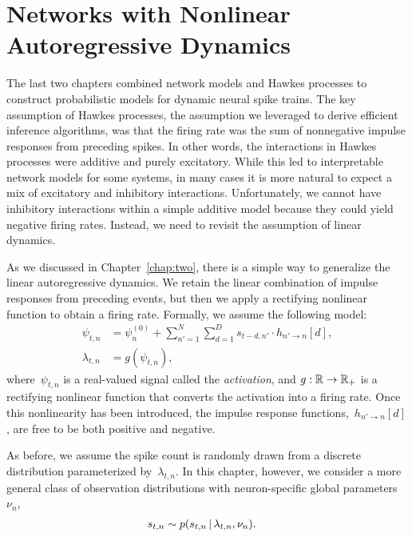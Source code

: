 
\chapter{Networks with Nonlinear Autoregressive Dynamics}
\label{chap:five}

The last two chapters combined network models and Hawkes processes to
construct probabilistic models for dynamic neural spike trains. The
key assumption of Hawkes processes, the assumption we leveraged to
derive efficient inference algorithms, was that the firing rate was the
sum of nonnegative impulse responses from preceding spikes. In other
words, the interactions in Hawkes processes were additive and purely
excitatory. While this led to interpretable network models for some
systems, in many cases it is more natural to expect a mix of
excitatory and inhibitory interactions. Unfortunately, we cannot have
inhibitory interactions within a simple additive model because they could
yield negative firing rates. Instead, we need to revisit the
assumption of linear dynamics.

As we discussed in Chapter~\ref{chap:two}, there is a simple way to
generalize the linear autoregressive dynamics. We retain the linear
combination of impulse responses from preceding events, but then we
apply a rectifying nonlinear function to obtain a firing rate.
Formally, we assume the following model:
\begin{align*}
  \psi_{t,n}
  &= \psi_{n}^{(0)} + \sum_{n'=1}^N \sum_{d=1}^{D} s_{t-d, n'} \cdot h_{n' \to n}[d], \\
  \lambda_{t,n} &= g(\psi_{t,n}),
\end{align*}
where~$\psi_{t,n}$ is a real-valued signal called the
\emph{activation}, and ${g: \mathbb{R} \to \mathbb{R}_+}$ is a rectifying
nonlinear function that converts the activation into a firing rate.
Once this nonlinearity has been introduced, the impulse response
functions,~$h_{n' \to n}[d]$, are free to be both positive and negative.

As before, we assume the spike count is randomly drawn from a discrete
distribution parameterized by~$\lambda_{t,n}$. In this chapter, however,
we consider a more general class of observation distributions with
neuron-specific global parameters~$\nu_n$,
\begin{align*}
  s_{t,n} &\sim p(s_{t,n} \,|\, \lambda_{t,n}, \nu_n).
\end{align*}

